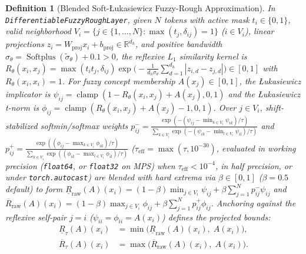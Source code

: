 \documentclass[10pt,twocolumn]{article}
\newtheorem{definition}{Definition}
\begin{document}
\begin{definition}[Blended Soft-{\L}ukasiewicz Fuzzy-Rough Approximation]
\label{def:fuzzy_rough}
In \texttt{DifferentiableFuzzyRoughLayer}, given $N$ tokens with active mask $t_i \in \{0,1\}$,
valid neighborhood $V_i = \{j \in \{1,\dots,N\} : \max(t_j, \delta_{ij}) = 1\}$ ($i \in V_i$),
linear projections $z_i = W_{\text{proj}} x_i + b_{\text{proj}} \in \mathbb{R}^{d_h}$, and
positive bandwidth $\sigma_\theta = \operatorname{Softplus}(\tilde{\sigma}_\theta) + 0.1 > 0$,
the reflexive $L_1$ similarity kernel is $R_\theta(x_i, x_j) = \max(t_i t_j,
\delta_{ij})\exp\!\big(-\frac{1}{d_h \sigma_\theta}\sum_{d=1}^{d_h} |z_{i,d} - z_{j,d}|\big)
\in [0, 1]$ with $R_\theta(x_i, x_i) = 1$. For fuzzy concept membership $A(x_j) \in [0, 1]$,
the {\L}ukasiewicz implicator is $\psi_{ij} = \operatorname{clamp}(1 - R_\theta(x_i,x_j) +
A(x_j), 0, 1)$ and the {\L}ukasiewicz t-norm is $\phi_{ij} =
\operatorname{clamp}(R_\theta(x_i,x_j) + A(x_j) - 1, 0, 1)$. Over $j \in V_i$, shift-stabilized
softmin/softmax weights $p_{ij}^- = \frac{\exp(-(\psi_{ij} - \min_{k\in
V_i}\psi_{ik})/\tau)}{\sum_{k\in V_i} \exp(-(\psi_{ik} - \min_{l\in V_i}\psi_{il})/\tau)}$ and
$p_{ij}^+ = \frac{\exp((\phi_{ij} - \max_{k\in V_i}\phi_{ik})/\tau)}{\sum_{k\in V_i}
\exp((\phi_{ik} - \max_{l\in V_i}\phi_{il})/\tau)}$ ($\tau_{\text{eff}} = \max(\tau,
10^{-30})$, evaluated in working precision (\texttt{float64}, or \texttt{float32} on MPS) when
$\tau_{\text{eff}} < 10^{-4}$, in half precision, or under \texttt{torch.autocast}) are blended
with hard extrema via $\beta \in [0, 1]$ ($\beta = 0.5$ default) to form
$\underline{R}_{\text{raw}}(A)(x_i) = (1-\beta)\min_{j\in V_i} \psi_{ij} + \beta \sum_{j=1}^N
p_{ij}^- \psi_{ij}$ and $\overline{R}_{\text{raw}}(A)(x_i) = (1-\beta)\max_{j\in V_i} \phi_{ij}
+ \beta \sum_{j=1}^N p_{ij}^+ \phi_{ij}$. Anchoring against the reflexive self-pair $j=i$
($\psi_{ii}=\phi_{ii}=A(x_i)$) defines the projected bounds:
\begin{equation}
\label{eq:fuzzy_rough_bounds}
\begin{aligned}
\underline{R}_\tau(A)(x_i) &= \min\!\big(\underline{R}_{\text{raw}}(A)(x_i),\; A(x_i)\big), \\
\overline{R}_\tau(A)(x_i) &= \max\!\big(\overline{R}_{\text{raw}}(A)(x_i),\; A(x_i)\big).
\end{aligned}
\end{equation}
\end{definition}
\end{document}
